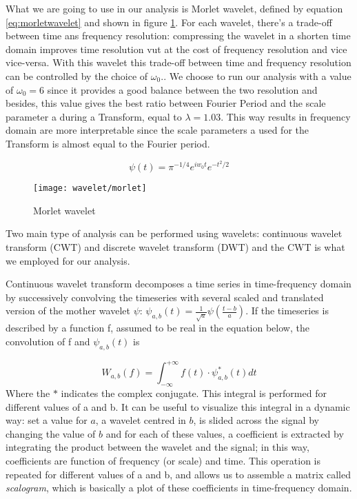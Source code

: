 \documentclass[11pt]{report}
\begin{document}
What we are going to use in our analysis is Morlet wavelet, defined by equation \ref{eq:morletwavelet} and shown in figure \ref{fig:wavelet_morlet}.
For each wavelet, there's a trade-off between time ans frequency resolution: compressing the wavelet in a shorten time domain improves time resolution vut at the cost of frequency resolution and vice vice-versa.
With this wavelet this trade-off between time and frequency resolution can be controlled by the choice of $\omega_0$.\cite{muller-2004}.
We choose to run our analysis with a value of $\omega_0 = 6$ since it provides a good balance between the two resolution \cite{grinsted-2004} and besides, this value gives the best ratio between Fourier Period and the scale parameter a during a Transform, equal to $\lambda = 1.03$.
This way results in frequency domain are more interpretable since the scale parameters a used for the Transform is almost equal to the Fourier period.


\begin{equation}\label{eq:morletwavelet}
\psi\left(t\right) = \pi^{-1/4}e^{iw_0 t}e^{-t^2/2}
\end{equation}

\begin{figure}[h]
\centering
\texttt{[image: wavelet/morlet]}
\caption{Morlet wavelet}
\label{fig:wavelet_morlet}
\end{figure}

Two main type of analysis can be performed using wavelets: continuous wavelet transform (CWT) and discrete wavelet transform (DWT) and the CWT is what we employed for our analysis.

Continuous wavelet transform decomposes a time series in time-frequency domain by successively convolving the timeseries with several scaled and translated version of the mother wavelet $\psi$: $\psi_{a, b}\left(t\right) = \frac{1}{\sqrt{a}}\psi(\frac{t-b}{a})$.
If the timeseries is described by a function f, assumed to be real in the equation below, the convolution of f and $\psi_{a, b}\left(t\right)$ is

\begin{equation}
W_{a,b}(f) = \int_{-\infty}^{+\infty}  f(t) \cdot \psi_{a, b}^\ast \left(t\right)   dt
\end{equation}
Where the $\ast$ indicates the complex conjugate.
This integral is performed for different values of a and b.
It can be useful to visualize this integral in a dynamic way: set a value for $a$, a wavelet centred in $b$, is slided across the signal by changing the value of $b$ and for each of these values, a coefficient is extracted by integrating the product between the wavelet and the signal; in this way, coefficients are function of frequency (or scale) and time. This operation is repeated for different values of a and b, and allows us to assemble a matrix called \emph{scalogram}, which is basically a plot of these coefficients in time-frequency domain.
\end{document}
